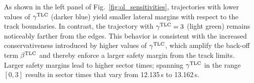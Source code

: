 
As shown in the left panel of Fig.~\ref{fig:ol_sensitivities}, trajectories with lower values of $\gamma^\textrm{TLC}$ (darker blue) yield smaller lateral margins with respect to the track boundaries. In contrast, the trajectory with $\gamma^\textrm{TLC} = 3$ (light green) remains noticeably farther from the edges.
This behavior is consistent with the increased conservativeness introduced by higher values of $\gamma^\textrm{TLC}$, which amplify the back-off term $\beta^\textrm{TLC}$ and thereby enforce a larger safety margin from the track limits.
Larger safety margins lead to higher sector times; spanning $\gamma^\textrm{TLC}$ in the range $\left[0,3\right]$ results in sector times that vary from 12.135\,s to 13.162\,s.

